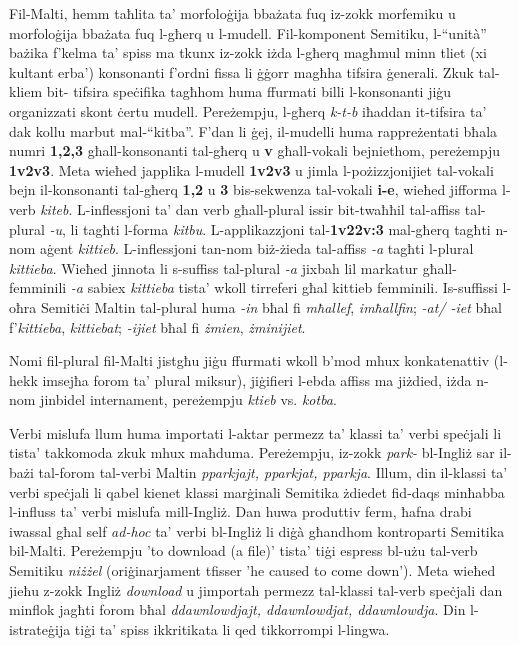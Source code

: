 \documentclass[]{../../metanetpaper}
\begin{document}
\begin{multicols}{2}
Fil-Malti, hemm taħlita ta’ morfoloġija bbażata fuq iz-zokk morfemiku u morfoloġija bbażata fuq l-għerq u l-mudell. Fil-komponent Semitiku, l-``unità'' bażika f’kelma ta’ spiss ma tkunx iz-zokk iżda l-għerq magħmul minn tliet (xi kultant erba’) konsonanti f’ordni fissa li ġġorr magħha tifsira ġenerali. Zkuk tal-kliem bit- tifsira speċifika tagħhom huma ffurmati billi l-konsonanti jiġu organizzati skont ċertu mudell. Pereżempju, l-għerq \emph{k-t-b} iħaddan it-tifsira ta’ dak kollu marbut mal-``kitba''. F'dan li ġej, il-mudelli huma rappreżentati bħala numri \textbf{1,2,3} għall-konsonanti tal-għerq u \textbf{v} għall-vokali bejniethom, pereżempju \textbf{1v2v3}. Meta wieħed japplika l-mudell \textbf{1v2v3} u jimla l-pożizzjonijiet tal-vokali bejn il-konsonanti tal-għerq \textbf{1,2} u \textbf{3} bis-sekwenza tal-vokali \textbf{i-e}, wieħed jifforma l-verb \emph{kiteb}. L-inflessjoni ta’ dan verb għall-plural issir bit-twaħħil tal-affiss tal-plural \emph{-u}, li tagħti l-forma \emph{kitbu}. L-applikazzjoni tal-\textbf{1v22v:3} mal-għerq tagħti n-nom aġent \emph{kittieb}. L-inflessjoni tan-nom biż-żieda tal-affiss \emph{-a} tagħti l-plural \emph{kittieba}. Wieħed jinnota li s-suffiss tal-plural \emph{-a} jixbah lil markatur għall-femminili \emph{-a} sabiex \emph{kittieba} tista’ wkoll tirreferi għal kittieb femminili. Is-suffissi l-oħra Semitiċi Maltin tal-plural huma \emph{-in} bħal fi \emph{mħallef}, \emph{imħallfin}; \emph{-at/ -iet} bħal f’\emph{kittieba}, \emph{kittiebat}; \emph{-ijiet} bħal fi \emph{żmien}, \emph{żminijiet}. 

Nomi fil-plural fil-Malti jistgħu jiġu ffurmati wkoll b’mod mhux konkatenattiv (l-hekk imsejħa forom ta’ plural miksur), jiġifieri l-ebda affiss ma jiżdied, iżda n-nom jinbidel internament, pereżempju \emph{ktieb} vs. \emph{kotba}.

Verbi mislufa llum huma importati l-aktar permezz ta’ klassi ta’ verbi speċjali li tista’ takkomoda zkuk mhux maħduma. Pereżempju, iz-zokk \emph{park-} bl-Ingliż sar il-bażi tal-forom tal-verbi Maltin \emph{pparkjajt, pparkjat, pparkja}. Illum, din il-klassi ta’ verbi speċjali li qabel kienet klassi marġinali Semitika żdiedet fid-daqs minħabba l-influss ta’ verbi mislufa mill-Ingliż. Dan huwa produttiv ferm, ħafna drabi iwassal għal self \emph{ad-hoc} ta’ verbi bl-Ingliż li diġà għandhom kontroparti Semitika bil-Malti. Pereżempju 'to download (a file)' tista’ tiġi espress bl-użu tal-verb Semitiku \emph{niżżel} (oriġinarjament tfisser 'he caused to come down'). Meta wieħed jieħu z-zokk Ingliż \emph{download} u  jimportah permezz tal-klassi tal-verb speċjali dan minflok jagħti forom bħal \emph{ddawnlowdjajt, ddawnlowdjat, ddawnlowdja}. Din l-istrateġija tiġi ta’ spiss ikkritikata li qed tikkorrompi l-lingwa\cite{Fabri:2011a}.


\end{multicols}
\end{document}
